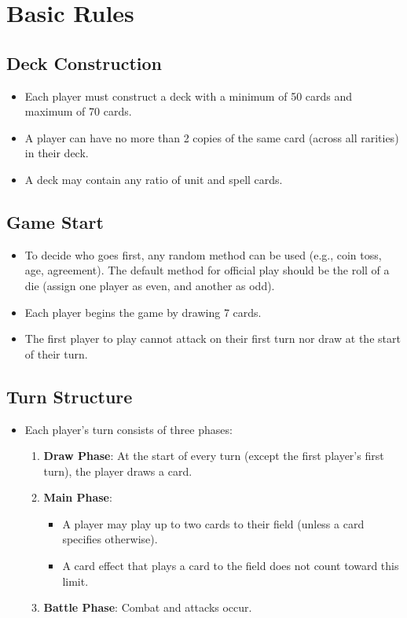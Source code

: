 \section{Basic Rules}

\subsection{Deck Construction}
\begin{itemize}
    \item Each player must construct a deck with a minimum of 50 cards and maximum of 70 cards.
    \item A player can have no more than 2 copies of the same card (across all rarities) in their deck.
    \item A deck may contain any ratio of unit and spell cards.
\end{itemize}





\subsection{Game Start}
\begin{itemize}
    \item To decide who goes first, any random method can be used (e.g., coin toss, age, agreement). The default method for official play should be the roll of a die (assign one player as even, and another as odd).
    \item Each player begins the game by drawing 7 cards.
    \item The first player to play cannot attack on their first turn nor draw at the start of their turn.
\end{itemize}








\subsection{Turn Structure}
\begin{itemize}
\item Each player's turn consists of three phases:
	\begin{enumerate}
	    \item \textbf{Draw Phase}: At the start of every turn (except the first player's first turn), the player draws a card.
	    \item \textbf{Main Phase}:
	    \begin{itemize}
	        \item A player may play up to two cards to their field (unless a card specifies otherwise).
	        \item A card effect that plays a card to the field does not count toward this limit.
	    \end{itemize}
	    \item \textbf{Battle Phase}: Combat and attacks occur.
	\end{enumerate}
\end{itemize}








